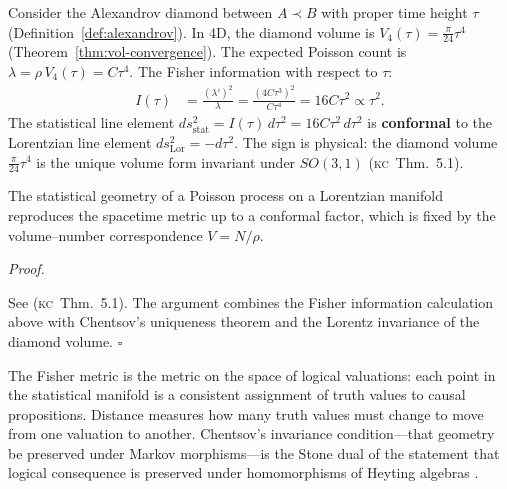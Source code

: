 \documentclass[11pt, a4paper, openany]{book}
\newcommand{\KC}[1]{\textnormal{(\textsc{kc}~#1)}}
\newcounter{thm}[chapter]
\renewenvironment{proof}[1][Proof]{%
  \par\noindent\textit{#1.}\quad
}{\hfill$\square$\par\medskip}
\begin{document}
Consider the Alexandrov diamond between $A \prec B$ with proper time
height $\tau$ (Definition~\ref{def:alexandrov}). In 4D, the diamond
volume is $V_4(\tau) = \frac{\pi}{24}\tau^4$
(Theorem~\ref{thm:vol-convergence}). The expected Poisson count is
$\lambda = \rho\,V_4(\tau) = C\tau^4$. The Fisher information with
respect to $\tau$:
\begin{align}
  I(\tau) &= \frac{(\lambda')^2}{\lambda}
  = \frac{(4C\tau^3)^2}{C\tau^4} = 16C\tau^2
  \propto \tau^2.
\end{align}
The statistical line element $ds^2_{\mathrm{stat}} = I(\tau)\,d\tau^2
= 16C\tau^2\,d\tau^2$ is \textbf{conformal} to the Lorentzian line
element $ds^2_{\mathrm{Lor}} = -d\tau^2$. The sign is physical: the
diamond volume $\frac{\pi}{24}\tau^4$ is the unique volume form
invariant under $SO(3,1)$ \KC{Thm.~5.1}.

\begin{theorem}[Metric Recovery \KC{Thm.~5.1}]\label{thm:metric-recovery}
The statistical geometry of a Poisson process on a Lorentzian manifold
reproduces the spacetime metric up to a conformal factor, which is
fixed by the volume--number correspondence $V = N/\rho$.
\end{theorem}

\begin{proof}
See \KC{Thm.~5.1}. The argument combines the Fisher information
calculation above with Chentsov's uniqueness theorem and the Lorentz
invariance of the diamond volume.
\end{proof}

\begin{logicalreading}
The Fisher metric is the metric on the space of logical valuations: each
point in the statistical manifold is a consistent assignment of truth
values to causal propositions. Distance measures how many truth values
must change to move from one valuation to another. Chentsov's invariance
condition---that geometry be preserved under Markov morphisms---is the
Stone dual of the statement that logical consequence is preserved under
homomorphisms of Heyting algebras \cite{stone1936,chentsov1982}.
\end{logicalreading}
\end{document}
